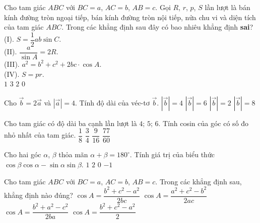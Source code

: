 \begin{ex}%
	Cho tam giác $ABC$ với $BC=a$, $AC=b$, $AB=c$. Gọi $R$, $r$, $p$, $S$ lần lượt là bán kính đường tròn ngoại tiếp, bán kính đường tròn nội tiếp, nửa chu vi và diện tích của tam giác $ABC$. Trong các khẳng định sau đây có bao nhiêu khẳng định \textbf{sai}?\\
	(I). $S=\dfrac{1}{2} ab \sin C$.\\
	(II). $\dfrac{a}{\sin A}=2R$.\\
	(III). $a^{2}=b^{2}+c^{2}+2bc \cdot \cos A$.\\
	(IV). $S=pr$.\\
	\choice
	{$1$}
	{\True $3$}
	{$2$}
	{$0$} 
\end{ex}

\begin{ex}%
	Cho $\vec{b}=2\vec{a}$ và $|\vec{a}|=4$. Tính độ dài của véc-tơ $\vec{b}$.
	\choice
	{$|\vec{b}|=4$}
	{$|\vec{b}|=6$}
	{$|\vec{b}|=2$}
	{\True $|\vec{b}|=8$}
\end{ex}

\begin{ex}%
	Cho tam giác có độ dài ba cạnh lần lượt là $4$; $5$; $6$. Tính cosin của góc có số đo nhỏ nhất của tam giác.
	\choice
	{$\dfrac{1}{8}$}
	{\True $\dfrac{3}{4}$}
	{$\dfrac{9}{16}$}
	{$\dfrac{77}{60}$}
\end{ex}

\begin{ex}%
	Cho hai góc $\alpha$, $\beta$ thỏa mãn $\alpha+\beta=180^{\circ}$. Tính giá trị của biểu thức $\cos \beta \cos \alpha-\sin \alpha \sin \beta$.
	\choice
	{$1$}
	{$2$}
	{$0$}
	{\True $-1$}
\end{ex}

\begin{ex}%
	Cho tam giác $ABC$ với $BC=a$, $AC=b$, $AB=c$. Trong các khẳng định sau, khẳng định nào đúng?
	\choice
	{\True $\cos A=\dfrac{b^{2}+c^{2}-a^{2}}{2bc}$}
	{$\cos A=\dfrac{a^{2}+c^{2}-b^{2}}{2ac}$}
	{$\cos A=\dfrac{b^{2}+a^{2}-c^{2}}{2ba}$}
	{$\cos A=\dfrac{b^{2}+c^{2}-a^{2}}{2}$}
\end{ex}

